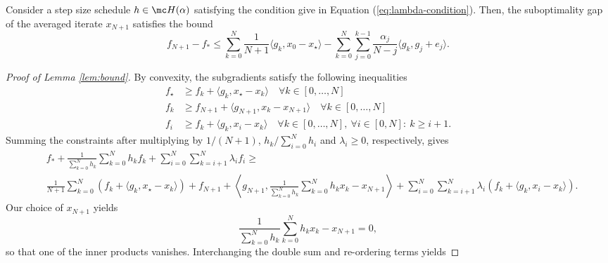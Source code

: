\documentclass{article}
\begin{document}
\begin{toappendix} 
\begin{lemma}\label{lem:bound}
  Consider a step size schedule $h\in \mc H(\alpha)$ satisfying the condition give in Equation (\ref{eq:lambda-condition}).
    Then, the suboptimality gap of the averaged iterate $x_{N+1}$ satisfies the bound
    \begin{equation}
        f_{N+1}-f_*\le \sum_{k=0}^N \frac{1}{N+1} \langle g_k , x_0 - x_\star \rangle - \sum_{k=0}^N \sum_{j=0}^{k-1} \frac{\alpha_j}{N-j} \langle g_k, g_j+e_j\rangle.
    \end{equation}
\end{lemma}
\begin{proof}[Proof of Lemma \ref{lem:bound}]
    By convexity, the subgradients satisfy the following inequalities
\begin{align*}
  f_\star & \geq f_k + \langle g_k , x_\star - x_k \rangle \quad \forall k\in [0, \dots, N]\\
  f_k &\geq f_{N+1} + \langle g_{N+1} , x_k - x_{N+1} \rangle \quad \forall k \in [0, \dots, N]\\
  f_i & \geq f_k + \langle g_k, x_i-x_k\rangle \quad \forall k \in [0, \dots, N],~ \forall i\in [0, N]: ~k\geq i+1.
\end{align*}
Summing the constraints after multiplying by $1/(N+1)$, $h_k/\sum_{i=0}^N h_i$ and $\lambda_i\geq 0$, respectively, gives
\begin{align*}
&f_*+\frac1{\sum_{k=0}^Nh_k}\sum_{k=0}^Nh_kf_k+\sum_{i=0}^N\sum_{k=i+1}^N\lambda_if_i \ge\\
 &\frac1{N+1}\sum_{k=0}^N\left( f_k+\langle g_k , x_\star - x_k \rangle\right) +f_{N+1}+\left\langle g_{N+1},\frac1{\sum_{k=0}^Nh_k}\sum_{k=0}^Nh_kx_k-x_{N+1}\right\rangle+\sum_{i=0}^N\sum_{k=i+1}^N\lambda_i\left(f_k+\langle g_k,x_i-x_k\rangle\right).
\end{align*}
Our choice of $x_{N+1}$ yields
\[
\frac1{\sum_{k=0}^Nh_k}\sum_{k=0}^Nh_kx_k-x_{N+1}=0,
\]
so that one of the inner products vanishes.
Interchanging the double sum and re-ordering terms yields

\end{proof}
\end{toappendix}
\end{document}
